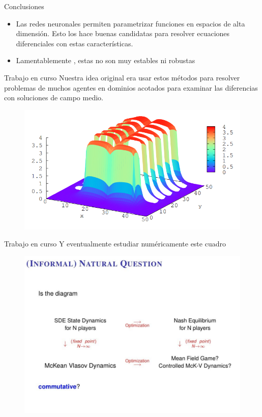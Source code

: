 \documentclass[aspectratio=169,xcolor=dvipsnames]{beamer}
\begin{document}
\begin{frame}{Conclusiones}
	\begin{itemize}
		\item Las redes neuronales permiten parametrizar funciones en espacios de alta dimensión. Esto los hace buenas candidatas para resolver ecuaciones diferenciales con estas características.
		\item Lamentablemente , estas no son muy estables ni robustas
	\end{itemize}
\end{frame}

\begin{frame}{Trabajo en curso}
	Nuestra idea original era usar estos métodos para resolver problemas de muchos agentes en dominios acotados para examinar las diferencias con soluciones de campo medio.\parencite{achdou_mean_2020}
	\begin{figure}
		\centering
		\includegraphics[width=0.7\linewidth]{images/achdou}
		\label{fig:achdou}
	\end{figure}

\end{frame}
\begin{frame}{Trabajo en curso}
	Y eventualmente estudiar numéricamente este cuadro
		\begin{figure}
		\centering
		\includegraphics[width=0.7\linewidth]{images/cuadro}
		\label{fig:cuadro}
	\end{figure}
\end{frame}
\end{document}
